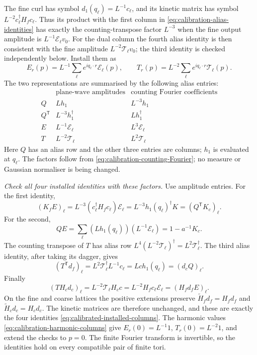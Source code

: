 \documentclass[11pt,reqno]{amsart}
\numberwithin{equation}{section}
\theoremstyle{definition}
\theoremstyle{remark}
\begin{document}
The fine curl has symbol \(d_1(q_\ell)=L^{-1}c_\ell\),
and its kinetic matrix has symbol
\(L^{-2}c_\ell^\dagger H_fc_\ell\). Thus its product
with the first column in
\eqref{eq:calibration-alias-identities} has exactly the
counting-transpose factor \(L^{-3}\) when the fine output
amplitude is \(L^{-1}\mathcal E_\ell v_0\).
For the dual column the fourth alias identity is then
consistent with the fine amplitude \(L^{-2}\mathcal T_\ell v_0\);
the third identity is checked independently below.
Install them as
\begin{equation}
 E_r(p)=L^{-1}\sum_\ell e^{iq_\ell\cdot r}\mathcal E_\ell(p),
 \qquad T_r(p)=L^{-2}\sum_\ell e^{iq_\ell\cdot r}\mathcal T_\ell(p).
 \label{eq:calibration-counting-columns}
\end{equation}
The two representations are summarised by the following
alias entries:
\begin{equation}
 \begin{array}{c|c|c}
  &\text{plane-wave amplitudes}&\text{counting Fourier coefficients}\\ \hline
  Q&Lh_1&L^{-3}h_1\\
  Q^{\mathsf T}&L^{-3}h_1^\dagger&Lh_1^\dagger\\
  E&L^{-1}\mathcal E_\ell&L^3\mathcal E_\ell\\
  T&L^{-2}\mathcal T_\ell&L^2\mathcal T_\ell
 \end{array}
 \label{eq:calibration-alias-normalisation-table}
\end{equation}
Here \(Q\) has an alias row and the other three entries
are columns; \(h_1\) is evaluated at \(q_\ell\).
The factors follow from \eqref{eq:calibration-counting-Fourier};
no measure or Gaussian normaliser is being changed.

\smallskip\noindent
\emph{Check all four installed identities with these factors.}
Use amplitude entries. For the first identity,
\[
 (K_fE)_\ell=L^{-3}(c_\ell^\dagger H_fc_\ell)\mathcal E_\ell
               =L^{-3}h_1(q_\ell)^\dagger K=(Q^{\mathsf T}K_c)_\ell.
\]
For the second,
\[
 QE=\sum_\ell (Lh_1(q_\ell))(L^{-1}\mathcal E_\ell)
                                      =1-a^{-1}K_c.
\]
The counting transpose of \(T\) has alias row
\(L^4(L^{-2}\mathcal T_\ell)^\dagger=L^2\mathcal T_\ell^\dagger\).
The third alias identity, after taking its dagger, gives
\[
 (T^{\mathsf T}d_f)_\ell=L^2\mathcal T_\ell^\dagger L^{-1}c_\ell
                   =Lch_1(q_\ell)=(d_cQ)_\ell.
\]
Finally
\[
 (TH_cd_c)_\ell=L^{-2}\mathcal T_\ell H_cc
                    =L^{-2}H_fc_\ell\mathcal E_\ell
                                      =(H_fd_fE)_\ell.
\]
On the fine and coarse lattices the positive extensions
preserve \(\widetilde H_fd_f=H_fd_f\) and
\(\widetilde H_cd_c=H_cd_c\). The kinetic matrices are
therefore unchanged, and these are exactly the four
identities \eqref{eq:calibrated-installed-columns}.
The harmonic values \eqref{eq:calibration-harmonic-columns}
give \(E_r(0)=L^{-1}1\), \(T_r(0)=L^{-2}1\), and extend
the checks to \(p=0\). The finite Fourier transform is
invertible, so the identities hold on every compatible
pair of finite tori.
\end{document}
